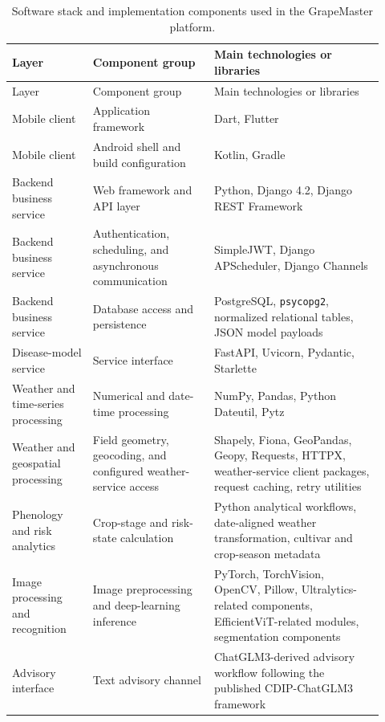 \documentclass[12pt]{article}
\begin{document}
\begingroup
\setlength{\tabcolsep}{3pt}
\renewcommand{\arraystretch}{1.12}
\begin{longtable}{@{}L{0.20\linewidth} L{0.30\linewidth} L{0.42\linewidth}@{}}
\caption{Software stack and implementation components used in the GrapeMaster platform.}\label{tab:supp_software_stack}\\
\toprule
Layer & Component group & Main technologies or libraries \\
\midrule
\endfirsthead
\toprule
Layer & Component group & Main technologies or libraries \\
\midrule
\endhead
Mobile client & Application framework & Dart, Flutter \\
Mobile client & Android shell and build configuration & Kotlin, Gradle \\
Backend business service & Web framework and API layer & Python, Django 4.2, Django REST Framework \\
Backend business service & Authentication, scheduling, and asynchronous communication & SimpleJWT, Django APScheduler, Django Channels \\
Backend business service & Database access and persistence & PostgreSQL, \texttt{psycopg2}, normalized relational tables, JSON model payloads \\
Disease-model service & Service interface & FastAPI, Uvicorn, Pydantic, Starlette \\
Weather and time-series processing & Numerical and date-time processing & NumPy, Pandas, Python Dateutil, Pytz \\
Weather and geospatial processing & Field geometry, geocoding, and configured weather-service access & Shapely, Fiona, GeoPandas, Geopy, Requests, HTTPX, weather-service client packages, request caching, retry utilities \\
Phenology and risk analytics & Crop-stage and risk-state calculation & Python analytical workflows, date-aligned weather transformation, cultivar and crop-season metadata \\
Image processing and recognition & Image preprocessing and deep-learning inference & PyTorch, TorchVision, OpenCV, Pillow, Ultralytics-related components, EfficientViT-related modules, segmentation components \\
Advisory interface & Text advisory channel & ChatGLM3-derived advisory workflow following the published CDIP-ChatGLM3 framework \\
\bottomrule
\end{longtable}
\endgroup
\end{document}
